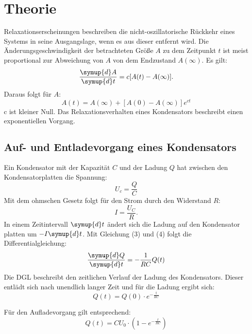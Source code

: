 \section{Theorie}
\label{sec:Theorie}

\cite{sample}
Relaxationserscheinungen beschreiben die nicht-oszillatorische Rückkehr eines Systems
in seine Ausgangslage, wenn es aus dieser entfernt wird. Die Änderungsgeschwindigkeit
der betrachteten Größe $A$ zu dem Zeitpunkt $t$ ist meist proportional zur Abweichung von $A$
von dem Endzustand $A(\infty)$. Es gilt:
\begin{equation}
  \frac{\symup{d}A}{\symup{d}t} = c[A(t)-A(\infty)].
\end{equation}
 Daraus folgt für $A$:
 \begin{equation}
   A(t) = A(\infty) + [A(0) - A(\infty)]e^{ct}
 \end{equation}
c ist kleiner Null. Das Relaxationsverhalten eines Kondensators beschreibt einen
exponentiellen Vorgang.

\subsection{Auf- und Entladevorgang eines Kondensators}

Ein Kondensator mit der Kapazität $C$ und der Ladung $Q$ hat zwischen den Kondensatorplatten
die Spannung:
\begin{equation}
  U_c = \frac{Q}{C}
\end{equation}
Mit dem ohmschen Gesetz folgt für den Strom durch den Widerstand $R$:
\begin{equation}
  I =\frac{U_C}{R}.
\end{equation}
In einem Zeitintervall $\symup{d}t$  ändert sich die Ladung auf den Kondensator platten um $-I\symup{d}t$.
Mit Gleichung (3) und (4) folgt die Differentialgleichung:
\begin{equation}
  \frac{\symup{d}Q}{\symup{d}t} = -\frac{1}{RC}Q(t)
\end{equation}
Die DGL beschreibt den zeitlichen Verlauf der Ladung des Kondensators. Dieser entlädt sich
nach unendlich langer Zeit und für die Ladung ergibt sich:
\begin{equation}
  Q(t) = Q(0) \cdot e^{-\frac{t}{RC}}
\end{equation}

Für den Aufladevorgang gilt entsprechend:
\begin{equation}
  Q(t) = CU_0 \cdot (1 - e^{-\frac{t}{RC}})
\end{equation}


